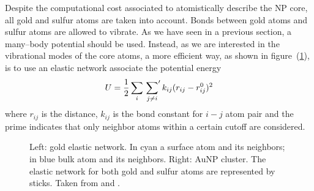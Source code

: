 Despite the computational cost associated to atomistically describe the \ac{NP} core, all gold and sulfur atoms 
are taken into account. Bonds between gold atoms and sulfur atoms are allowed to vibrate. As we have seen in a 
previous section, a many--body potential should be used. Instead, as we are interested in the vibrational modes of the core atoms, 
a more efficient way, as shown in figure~(\ref{fig:coreNetwork}), is to use an elastic network associate the 
potential energy
\begin{equation*}
	U = \frac{1}{2}\sum_i \sideset{}{'}\sum_{j\ne i}k_{ij}(r_{ij} - r_{ij}^0)^2
\end{equation*}
where $r_{ij}$ is the distance, $k_{ij}$ is the bond constant for $i-j$ atom pair and the prime indicates that 
only neighbor atoms within a certain cutoff are considered. 
\begin{figure}[h!t]
	\centering%
	\qquad%
	\caption{Left: gold elastic network. In cyan a surface atom and its neighbors; in blue bulk atom and its neighbors. Right: \acs{AuNP} cluster. The elastic network for both gold and sulfur atoms are represented by sticks. Taken from \cite{simonelliThesis} and \cite{ourPaper}.}
	\label{fig:coreNetwork}
\end{figure}

